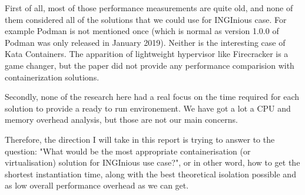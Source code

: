First of all, most of those performance measurements are quite old, and none of them considered all of the solutions that we could use for INGInious case.  For example Podman is not mentioned once (which is normal as version 1.0.0 of Podman was only released in January 2019).  Neither is the interesting case of Kata Containers.  The apparition of lightweight hypervisor like Firecracker is a game changer, but the paper did not provide any performance comparision with containerization solutions.

Secondly, none of the research here had a real focus on the time required for each solution to provide a ready to run environement.  We have got a lot a CPU and memory overhead analysis, but those are not our main concerns.

Therefore, the direction I will take in this report is trying to answer to the question: "What would be the most appropriate containerisation (or virtualisation) solution for INGInious use case?", or in other word, how to get the shortest instantiation time, along with the best theoretical isolation possible and as low overall performance overhead as we can get.
